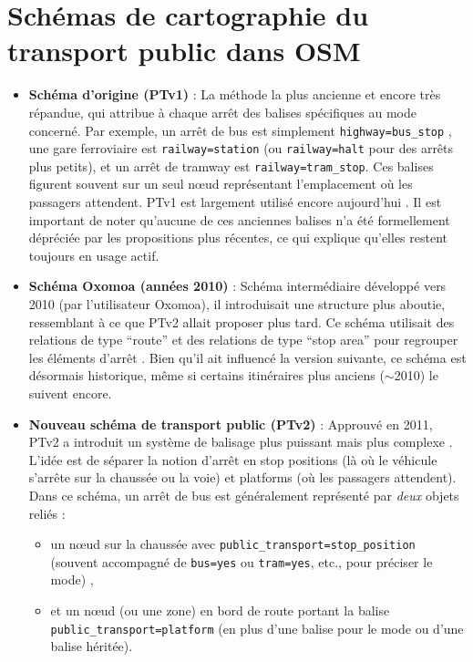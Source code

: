 \section{Schémas de cartographie du transport public dans OSM}
\begin{itemize}
    \item \textbf{Schéma d'origine (PTv1)} : La méthode la plus ancienne et encore très répandue, qui attribue à chaque arrêt des balises spécifiques au mode concerné. Par exemple, un arrêt de bus est simplement \verb|highway=bus_stop| , une gare ferroviaire est \texttt{railway=station} (ou \texttt{railway=halt} pour des arrêts plus petits), et un arrêt de tramway est \verb|railway=tram_stop|. Ces balises figurent souvent sur un seul nœud représentant l'emplacement où les passagers attendent.
    PTv1 est largement utilisé encore aujourd’hui .
    Il est important de noter qu’aucune de ces anciennes balises n’a été formellement dépréciée par les propositions plus récentes, ce qui explique qu’elles restent toujours en usage actif.

    \item \textbf{Schéma Oxomoa (années 2010)} : Schéma intermédiaire développé vers 2010 (par l’utilisateur Oxomoa), il introduisait une structure plus aboutie, ressemblant à ce que PTv2 allait proposer plus tard. Ce schéma utilisait des relations de type ``route'' et des relations de type ``stop area'' pour regrouper les éléments d’arrêt . Bien qu’il ait influencé la version suivante, ce schéma est désormais historique, même si certains itinéraires plus anciens ($\sim$2010) le suivent encore.

    \item \textbf{Nouveau schéma de transport public (PTv2)} : Approuvé en 2011, PTv2 a introduit un système de balisage plus puissant mais plus complexe . L’idée est de séparer la notion d’arrêt en stop positions (là où le véhicule s’arrête sur la chaussée ou la voie) et platforms (où les passagers attendent). Dans ce schéma, un arrêt de bus est généralement représenté par \textit{deux} objets reliés :
    \begin{itemize}
        \item un nœud sur la chaussée avec \verb|public_transport=stop_position| (souvent accompagné de \texttt{bus=yes} ou \texttt{tram=yes}, etc., pour préciser le mode) ,
        \item et un nœud (ou une zone) en bord de route portant la balise \verb|public_transport=platform| (en plus d'une balise pour le mode ou d'une balise héritée).
    \end{itemize}
    

\end{itemize}
